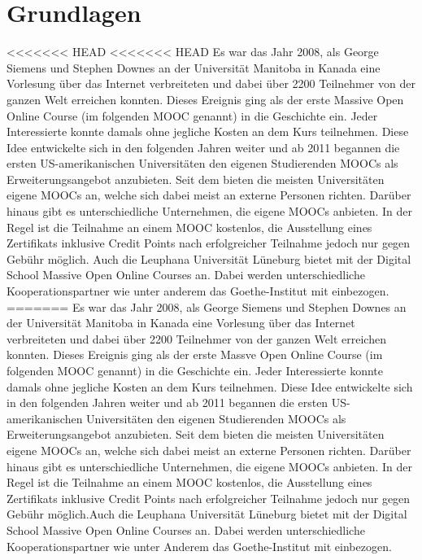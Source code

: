 \section{Grundlagen} %
\label{sec:grundlagen}
<<<<<<< HEAD
<<<<<<< HEAD
Es war das Jahr 2008, als George Siemens und Stephen Downes an der Universität Manitoba in Kanada eine Vorlesung über das Internet verbreiteten und dabei über 2200 Teilnehmer von der ganzen Welt erreichen konnten. Dieses Ereignis ging als der erste Massive Open Online Course (im folgenden MOOC genannt) in die Geschichte ein. Jeder Interessierte konnte damals ohne jegliche Kosten an dem Kurs teilnehmen. Diese Idee entwickelte sich in den folgenden Jahren weiter und ab 2011 begannen die ersten US-amerikanischen Universitäten den eigenen Studierenden MOOCs als Erweiterungsangebot anzubieten. Seit dem bieten die meisten Universitäten eigene MOOCs an, welche sich dabei meist an externe Personen richten. Darüber hinaus gibt es unterschiedliche Unternehmen, die eigene MOOCs anbieten. In der Regel ist die Teilnahme an einem MOOC kostenlos, die Ausstellung eines Zertifikats inklusive Credit Points nach erfolgreicher Teilnahme jedoch nur gegen Gebühr möglich.
\newline 
Auch die Leuphana Universität Lüneburg bietet mit der Digital School Massive Open Online Courses an. Dabei werden unterschiedliche Kooperationspartner wie unter anderem das Goethe-Institut mit einbezogen.
=======
Es war das Jahr 2008, als George Siemens und Stephen Downes an der Universität Manitoba in Kanada eine Vorlesung über das Internet verbreiteten und dabei über 2200 Teilnehmer von der ganzen Welt erreichen konnten. Dieses Ereignis ging als der erste Massve Open Online Course (im folgenden MOOC genannt) in die Geschichte ein. Jeder Interessierte konnte damals ohne jegliche Kosten an dem Kurs teilnehmen. Diese Idee entwickelte sich in den folgenden Jahren weiter und ab 2011 begannen die ersten US-amerikanischen Universitäten den eigenen Studierenden MOOCs als Erweiterungsangebot anzubieten. Seit dem bieten die meisten Universitäten eigene MOOCs an, welche sich dabei meist an externe Personen richten. Darüber hinaus gibt es unterschiedliche Unternehmen, die eigene MOOCs anbieten. In der Regel ist die Teilnahme an einem MOOC kostenlos, die Ausstellung eines Zertifikats inklusive Credit Points nach erfolgreicher Teilnahme jedoch nur gegen Gebühr möglich.\newline Auch die Leuphana Universität Lüneburg bietet mit der Digital School Massive Open Online Courses an. Dabei werden unterschiedliche Kooperationspartner wie unter Anderem das Goethe-Institut mit einbezogen.
